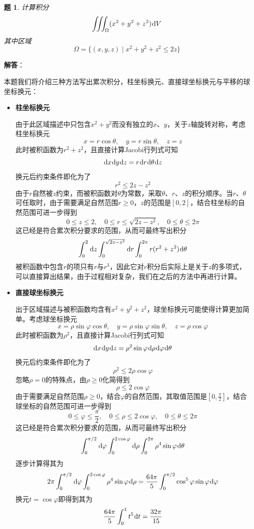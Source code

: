 \documentclass[a4paper,UTF8,fontset=windows,AutoFakeBold]{ctexart}
\newcommand*{\dr}{\hspace{0.07em}\mathrm{d}}
\theoremstyle{ex}
\newtheorem{exercise}{题}
\newcommand{\sol}[1]{{\vspace{5pt}\kaishu\noindent\textbf{解答}：\vspace{-3pt}
\begin{compactitem}
    \item[] #1
\end{compactitem}
}}
\begin{document}
\begin{framed}
\begin{exercise}
    计算积分
    $$\iiint_\Omega(x^2+y^2+z^2)\dr V$$
    其中区域
    $$\Omega=\{(x,y,z)\mid x^2+y^2+z^2\le 2z\}$$
\end{exercise}
\sol{
    本题我们将介绍三种方法写出累次积分，柱坐标换元、直接球坐标换元与平移的球坐标换元：
    \begin{itemize}
        \item \textbf{柱坐标换元}
        
        由于此区域描述中只包含$x^2+y^2$而没有独立的$x$、$y$，关于$z$轴旋转对称，考虑柱坐标换元
        $$x=r\cos\theta,\quad y=r\sin\theta,\quad z=z$$
        此时被积函数为$r^2+z^2$，且直接计算Jacobi行列式可知
        $$\dr x\dr y\dr z=r\dr r\dr\theta\dr z$$
        换元后约束条件即化为了
        $$r^2\le 2z-z^2$$
        由于$r$自然被$z$约束，而被积函数对$\theta$为常数，采取$\theta$、$r$、$z$的积分顺序。当$r$、$\theta$可任取时，由于需要满足自然范围$r\ge0$，$z$的范围是$[0,2]$，结合柱坐标的自然范围可进一步得到
        $$0\le z\le2,\quad0\le r\le\sqrt{2z-z^2},\quad 0\le\theta\le 2\pi$$
        这已经是符合累次积分要求的范围，从而可最终写出积分
        $$\int_0^2\dr z\int_0^{\sqrt{2z-z^2}}\dr r\int_0^{2\pi}r(r^2+z^2)\dr\theta$$
        被积函数中包含$r$的项只有$r$与$r^3$，因此它对$r$积分后实际上是关于$z$的多项式，可以直接算出结果，由于过程相对复杂，我们在之后的方法中再进行计算。

        \item \textbf{直接球坐标换元}
        
        出于区域描述与被积函数均含有$x^2+y^2+z^2$，球坐标换元可能使得计算更加简单。考虑球坐标换元
        $$x=\rho\sin\varphi\cos\theta,\quad y=\rho\sin\varphi\sin\theta,\quad z=\rho\cos\varphi$$
        此时被积函数为$\rho^2$，且直接计算Jacobi行列式可知
        $$\dr x\dr y\dr z=\rho^2\sin\varphi\dr\rho\dr\varphi\dr\theta$$
        换元后约束条件即化为了
        $$\rho^2\le2\rho\cos\varphi$$
        忽略$\rho=0$的特殊点，由$\rho\ge0$化简得到
        $$\rho\le2\cos\varphi$$
        由于需要满足自然范围$\rho\ge0$，结合$\varphi$的自然范围，其取值范围是$[0,\frac{\pi}{2}]$，结合球坐标的自然范围可进一步得到
        $$0\le\varphi\le\frac{\pi}{2},\quad 0\le\rho\le2\cos\varphi,\quad 0\le\theta\le2\pi$$
        这已经是符合累次积分要求的范围，从而可最终写出积分
        $$\int_0^{\pi/2}\dr\varphi\int_0^{2\cos\varphi}\dr\rho\int_0^{2\pi}\rho^4\sin\varphi\dr\theta$$
        逐步计算得其为
        $$2\pi\int_0^{\pi/2}\dr\varphi\int_0^{2\cos\varphi}\rho^4\sin\varphi\dr\rho=\frac{64\pi}{5}\int_0^{\pi/2}\cos^5\varphi\sin\varphi\dr\varphi$$
        换元$t=\cos\varphi$即得到其为
        $$\frac{64\pi}{5}\int_0^1t^5\dr t=\frac{32\pi}{15}$$


\end{itemize}}
\end{framed}
\end{document}
